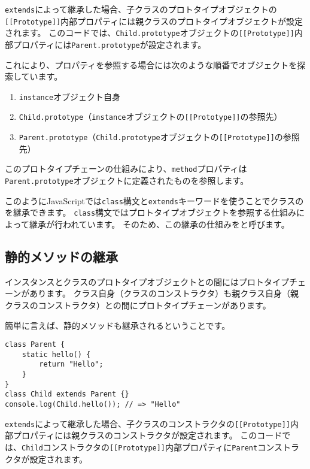 \texttt{extends}によって継承した場合、子クラスのプロトタイプオブジェクトの\texttt{[[Prototype]]}内部プロパティには親クラスのプロトタイプオブジェクトが設定されます。
このコードでは、\texttt{Child.prototype}オブジェクトの\texttt{[[Prototype]]}内部プロパティには\texttt{Parent.prototype}が設定されます。

これにより、プロパティを参照する場合には次のような順番でオブジェクトを探索しています。

\begin{enumerate}
\def\labelenumi{\arabic{enumi}.}
\item
  \texttt{instance}オブジェクト自身
\item
  \texttt{Child.prototype}（\texttt{instance}オブジェクトの\texttt{[[Prototype]]}の参照先）
\item
  \texttt{Parent.prototype}（\texttt{Child.prototype}オブジェクトの\texttt{[[Prototype]]}の参照先）
\end{enumerate}

このプロトタイプチェーンの仕組みにより、\texttt{method}プロパティは\texttt{Parent.prototype}オブジェクトに定義されたものを参照します。

このようにJavaScriptでは\texttt{class}構文と\texttt{extends}キーワードを使うことでクラスの\textbf{}を継承できます。
\texttt{class}構文ではプロトタイプオブジェクトを参照する仕組みによって継承が行われています。
そのため、この継承の仕組みを\textbf{}と呼びます。

\hypertarget{static-inheritance}{%
\subsection{静的メソッドの継承}\label{static-inheritance}}

インスタンスとクラスのプロトタイプオブジェクトとの間にはプロトタイプチェーンがあります。
クラス自身（クラスのコンストラクタ）も親クラス自身（親クラスのコンストラクタ）との間にプロトタイプチェーンがあります。

簡単に言えば、静的メソッドも継承されるということです。

\begin{lstlisting}
class Parent {
    static hello() {
        return "Hello";
    }
}
class Child extends Parent {}
console.log(Child.hello()); // => "Hello"
\end{lstlisting}

\texttt{extends}によって継承した場合、子クラスのコンストラクタの\texttt{[[Prototype]]}内部プロパティには親クラスのコンストラクタが設定されます。
このコードでは、\texttt{Child}コンストラクタの\texttt{[[Prototype]]}内部プロパティに\texttt{Parent}コンストラクタが設定されます。

